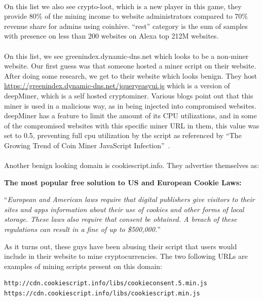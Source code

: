 \documentclass[letterpaper]{scrartcl} %
\numberwithin{equation}{section} %
\numberwithin{figure}{section} %
\numberwithin{table}{section} %
\begin{document}
\paragraph{}
On this list we also see crypto-loot, which is a new player in this game, they provide 80\% of the mining income to website administrators compared to 70\% revenue share for admins using coinhive.
``rest'' category is the sum of samples with presence on less than 200 websites on Alexa top 212M websites.

\paragraph{}
On this list, we see greenindex.dynamic-dns.net which looks to be a non-miner website. Our first guess was that someone hosted a miner script on their website. After doing some research, we get to their website which looks benign. They host \href{https://greenindex.dynamic-dns.net/jqueryeasyui.js}{https://greenindex.dynamic-dns.net/jqueryeasyui.js} which is a version of deepMiner, which is a self hosted cryptominer. Various blogs point out that this miner is used in a malicious way, as in being injected into compromised websites. deepMiner has a feature to limit the amount of its CPU utilizations, and in some of the compromised websites with this specific miner URL in them, this value was set to 0.5, preventing full cpu utilization by the script as referenced by ``The Growing Trend of Coin Miner JavaScript Infection''~\cite{ref:fortinet-minerinfection}.

\paragraph{}
Another benign looking domain is cookiescript.info. They advertise themselves as:

\textbf{The most popular free solution to US and European Cookie Laws:}

``\textit{European and American laws require that digital publishers give visitors to their sites and apps information about their use of cookies and other forms of local storage. These laws also require that consent be obtained. A breach of these regulations can result in a fine of up to \$500,000.}''

As it turns out, these guys have been abusing their script that users would include in their website to mine cryptocurrencies. The two following URLs are examples of mining scripts present on this domain:

\begin{lstlisting}
http://cdn.cookiescript.info/libs/cookieconsent.5.min.js
https://cdn.cookiescript.info/libs/cookiescript.min.js
\end{lstlisting}
\end{document}
